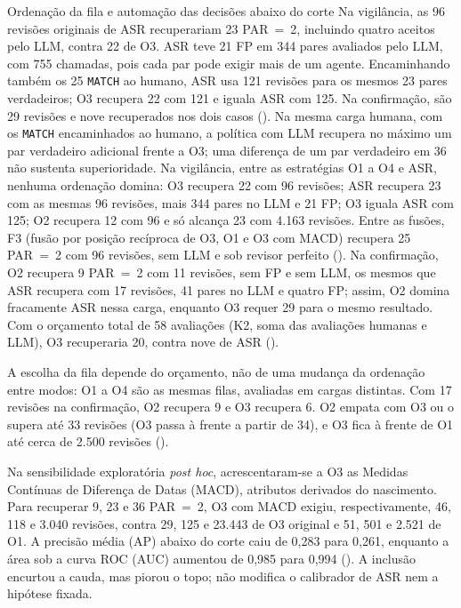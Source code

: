 \begin{chapter}{Ordenação da fila e automação das decisões abaixo do corte}
Na vigilância, as 96 revisões originais de ASR recuperariam 23 PAR~=~2, incluindo quatro aceitos pelo LLM, contra 22 de O3. ASR teve 21 FP em 344 pares avaliados pelo LLM, com 755 chamadas, pois cada par pode exigir mais de um agente. Encaminhando também os 25 \texttt{MATCH} ao humano, ASR usa 121 revisões para os mesmos 23 pares verdadeiros; O3 recupera 22 com 121 e iguala ASR com 125. Na confirmação, são 29 revisões e nove recuperados nos dois casos (). Na mesma carga humana, com os \texttt{MATCH} encaminhados ao humano, a política com LLM recupera no máximo um par verdadeiro adicional frente a O3; uma diferença de um par verdadeiro em 36 não sustenta superioridade. Na vigilância, entre as estratégias O1 a O4 e ASR, nenhuma ordenação domina: O3 recupera 22 com 96 revisões; ASR recupera 23 com as mesmas 96 revisões, mais 344 pares no LLM e 21 FP; O3 iguala ASR com 125; O2 recupera 12 com 96 e só alcança 23 com 4.163 revisões. Entre as fusões, F3 (fusão por posição recíproca de O3, O1 e O3 com MACD) recupera 25 PAR~=~2 com 96 revisões, sem LLM e sob revisor perfeito (). Na confirmação, O2 recupera 9 PAR~=~2 com 11 revisões, sem FP e sem LLM, os mesmos que ASR recupera com 17 revisões, 41 pares no LLM e quatro FP; assim, O2 domina fracamente ASR nessa carga, enquanto O3 requer 29 para o mesmo resultado. Com o orçamento total de 58 avaliações (K2, soma das avaliações humanas e LLM), O3 recuperaria 20, contra nove de ASR ().

A escolha da fila depende do orçamento, não de uma mudança da ordenação entre modos: O1 a O4 são as mesmas filas, avaliadas em cargas distintas. Com 17 revisões na confirmação, O2 recupera 9 e O3 recupera 6. O2 empata com O3 ou o supera até 33 revisões (O3 passa à frente a partir de 34), e O3 fica à frente de O1 até cerca de 2.500 revisões ().

Na sensibilidade exploratória \textit{post hoc}, acrescentaram-se a O3 as Medidas Contínuas de Diferença de Datas (MACD), atributos derivados do nascimento. Para recuperar 9, 23 e 36 PAR~=~2, O3 com MACD exigiu, respectivamente, 46, 118 e 3.040 revisões, contra 29, 125 e 23.443 de O3 original e 51, 501 e 2.521 de O1. A precisão média (AP) abaixo do corte caiu de 0,283 para 0,261, enquanto a área sob a curva ROC (AUC) aumentou de 0,985 para 0,994 (). A inclusão encurtou a cauda, mas piorou o topo; não modifica o calibrador de ASR nem a hipótese fixada.


\end{chapter}
